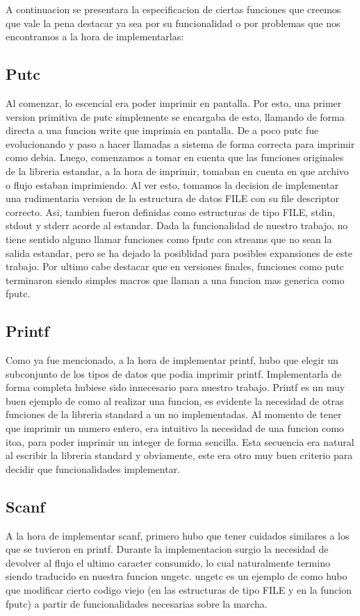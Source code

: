 \documentclass[a4paper,10pt]{article}
\begin{document}
    A continuacion se presentara la especificacion de ciertas funciones que creemos que vale la pena destacar ya sea por su funcionalidad o por problemas que nos encontramos a la hora de implementarlas:

    \subsection{Putc}
        Al comenzar, lo escencial era poder imprimir en pantalla. Por esto, una primer version primitiva de putc simplemente se encargaba de esto, llamando de forma directa a una funcion write que imprimia en pantalla. De a poco putc fue evolucionando y paso a hacer llamadas a sistema de forma correcta para imprimir como debia.
        Luego, comenzamos a tomar en cuenta que las funciones originales de la libreria estandar, a la hora de imprimir, tomaban en cuenta en que archivo o flujo estaban imprimiendo. Al ver esto, tomamos la decision de implementar una rudimentaria version de la estructura de datos FILE con su file descriptor correcto. Asi, tambien fueron definidas como estructuras de tipo FILE, stdin, stdout y stderr acorde al estandar. Dada la funcionalidad de nuestro trabajo, no tiene sentido alguno llamar funciones como fputc con streams que no sean la salida estandar, pero se ha dejado la posiblidad para posibles expansiones de este trabajo.
        Por ultimo cabe destacar que en versiones finales, funciones como putc terminaron siendo simples macros que llaman a una funcion mas generica como fputc.

    \subsection{Printf}
        Como ya fue mencionado, a la hora de implementar printf, hubo que elegir un subconjunto de los tipos de datos que podia imprimir printf. Implementarla de forma completa hubiese sido innecesario para nuestro trabajo. Printf es un muy buen ejemplo de como al realizar una funcion, es evidente la necesidad de otras funciones de la libreria standard a un no implementadas. Al momento de tener que imprimir un numero entero, era intuitivo la necesidad de una funcion como itoa, para poder imprimir un integer de forma sencilla. Esta secuencia era natural al escribir la libreria standard y obviamente, este era otro muy buen criterio para decidir que funcionalidades implementar.

    \subsection{Scanf}    
        A la hora de implementar scanf, primero hubo que tener cuidados similares a los que se tuvieron en printf. Durante la implementacion surgio la necesidad de devolver al flujo el ultimo caracter consumido, lo cual naturalmente termino siendo traducido en nuestra funcion ungetc. ungetc es un ejemplo de como hubo que modificar cierto codigo viejo (en las estructuras de tipo FILE y en la funcion fputc) a partir de funcionalidades necesarias sobre la marcha.
\end{document}
